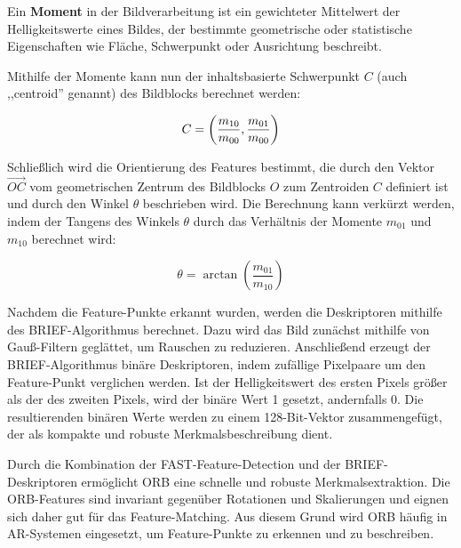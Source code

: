 \begin{tcolorbox}[colback=THAi-Blue!20!white, colframe=THAi-Blue]
    Ein \textbf{Moment} in der Bildverarbeitung ist ein gewichteter Mittelwert der Helligkeitswerte eines Bildes, der bestimmte geometrische oder statistische Eigenschaften wie Fläche, Schwerpunkt oder Ausrichtung beschreibt. \cite{wikipedia2024moment}
\end{tcolorbox}

Mithilfe der Momente kann nun der inhaltsbasierte Schwerpunkt \( C \) (auch ,,centroid'' genannt) des Bildblocks berechnet werden:

\begin{equation}
C = 
\left(
\frac{m_{10}}{m_{00}}, \\
\frac{m_{01}}{m_{00}}
\right)
\end{equation}

Schließlich wird die Orientierung des Features bestimmt, die durch den Vektor \( \overrightarrow{OC} \) vom geometrischen Zentrum des Bildblocks \( O \) zum Zentroiden \( C \) definiert ist und durch den Winkel \( \theta \) beschrieben wird. Die Berechnung kann verkürzt werden, indem der Tangens des Winkels \( \theta \) durch das Verhältnis der Momente \( m_{01} \) und \( m_{10} \) berechnet wird:

\begin{equation}
    \theta = \arctan \left( \frac{m_{01}}{m_{10}} \right)
\end{equation}

Nachdem die Feature-Punkte erkannt wurden, werden die Deskriptoren mithilfe des BRIEF-Algorithmus berechnet. Dazu wird das Bild zunächst mithilfe von Gauß-Filtern geglättet, um Rauschen zu reduzieren. Anschließend erzeugt der BRIEF-Algorithmus binäre Deskriptoren, indem zufällige Pixelpaare um den Feature-Punkt verglichen werden. Ist der Helligkeitswert des ersten Pixels größer als der des zweiten Pixels, wird der binäre Wert 1 gesetzt, andernfalls 0. Die resultierenden binären Werte werden zu einem 128-Bit-Vektor zusammengefügt, der als kompakte und robuste Merkmalsbeschreibung dient. \cite{gao2021vSLAM, calonder2010brief}

Durch die Kombination der FAST-Feature-Detection und der BRIEF-Deskriptoren ermöglicht ORB eine schnelle und robuste Merkmalsextraktion. Die ORB-Features sind invariant gegenüber Rotationen und Skalierungen und eignen sich daher gut für das Feature-Matching. Aus diesem Grund wird ORB häufig in AR-Systemen eingesetzt, um Feature-Punkte zu erkennen und zu beschreiben. \cite{gao2021vSLAM, rublee2011orb}

